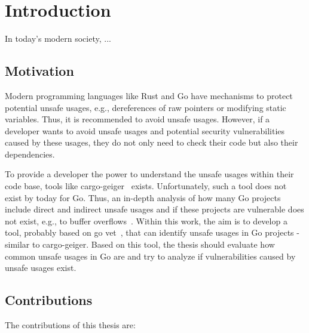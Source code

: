 
\chapter{Introduction}\label{ch:introduction}

In today's modern society, ...



\section{Motivation}\label{sec:motivation}

Modern programming languages like Rust and Go have mechanisms to protect potential
unsafe usages, e.g., dereferences of raw pointers or modifying static variables. Thus, it is
recommended to avoid unsafe usages. However, if a developer wants to avoid unsafe
usages and potential security vulnerabilities caused by these usages, they do not only need
to check their code but also their dependencies.

To provide a developer the power to understand the unsafe usages within their code base,
tools like cargo-geiger~\cite{cargogeiger} exists. Unfortunately, such a tool does not exist by today for Go.
Thus, an in-depth analysis of how many Go projects include direct and indirect unsafe
usages and if these projects are vulnerable does not exist, e.g., to buffer overflows~\cite{larochelle2001, alnaeli2017, wang2020}.
Within this work, the aim is to develop a tool, probably based on go vet~\cite{govet}, that can identify
unsafe usages in Go projects - similar to cargo-geiger. Based on this tool, the thesis should
evaluate how common unsafe usages in Go are and try to analyze if vulnerabilities caused
by unsafe usages exist.



\section{Contributions}\label{sec:contributions}

The contributions of this thesis are:


